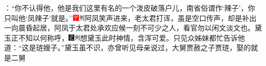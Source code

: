 ：``你不认得他，他是我们这里有名的一个泼皮破落户儿，南省俗谓作`辣子'，你只叫他`凤辣子'就是。''{\includegraphics[width=3mm]{../Images/00002}\includegraphics[width=3mm]{../Images/00011}\footnotesize \kaishu 阿凤笑声进来，老太君打诨，虽是空口传声，却是补出一向晨昏起居，阿凤于太君处承欢应候一刻不可少之人，看官勿以闲文淡文也。}黛玉正不知以何称呼，{\includegraphics[width=3mm]{../Images/00006}\includegraphics[width=3mm]{../Images/00011}\footnotesize \kaishu 想黛玉此时神情，含浑可爱。}只见众姊妹都忙告诉他道：``这是琏嫂子。''黛玉虽不识，亦曾听见母亲说过，大舅贾赦之子贾琏，娶的就是二舅